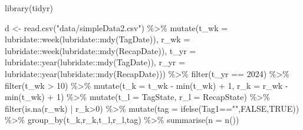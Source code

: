 \documentclass[
]{article}
\newenvironment{Shaded}{\begin{snugshade}}{\end{snugshade}}
\newcommand{\AttributeTok}[1]{\textcolor[rgb]{0.77,0.63,0.00}{#1}}
\newcommand{\ConstantTok}[1]{\textcolor[rgb]{0.00,0.00,0.00}{#1}}
\newcommand{\DecValTok}[1]{\textcolor[rgb]{0.00,0.00,0.81}{#1}}
\newcommand{\FunctionTok}[1]{\textcolor[rgb]{0.00,0.00,0.00}{#1}}
\newcommand{\NormalTok}[1]{#1}
\newcommand{\OtherTok}[1]{\textcolor[rgb]{0.56,0.35,0.01}{#1}}
\newcommand{\SpecialCharTok}[1]{\textcolor[rgb]{0.00,0.00,0.00}{#1}}
\newcommand{\StringTok}[1]{\textcolor[rgb]{0.31,0.60,0.02}{#1}}
\begin{document}
\begin{Shaded}
\begin{Highlighting}[]
\FunctionTok{library}\NormalTok{(tidyr)}

\NormalTok{d }\OtherTok{\textless{}{-}} \FunctionTok{read.csv}\NormalTok{(}\StringTok{"data/simpleData2.csv"}\NormalTok{) }\SpecialCharTok{\%\textgreater{}\%}
  \FunctionTok{mutate}\NormalTok{(}\AttributeTok{t\_wk =}\NormalTok{ lubridate}\SpecialCharTok{::}\FunctionTok{week}\NormalTok{(lubridate}\SpecialCharTok{::}\FunctionTok{mdy}\NormalTok{(TagDate)),}
         \AttributeTok{r\_wk =}\NormalTok{ lubridate}\SpecialCharTok{::}\FunctionTok{week}\NormalTok{(lubridate}\SpecialCharTok{::}\FunctionTok{mdy}\NormalTok{(RecapDate)),}
         \AttributeTok{t\_yr =}\NormalTok{ lubridate}\SpecialCharTok{::}\FunctionTok{year}\NormalTok{(lubridate}\SpecialCharTok{::}\FunctionTok{mdy}\NormalTok{(TagDate)),}
         \AttributeTok{r\_yr =}\NormalTok{ lubridate}\SpecialCharTok{::}\FunctionTok{year}\NormalTok{(lubridate}\SpecialCharTok{::}\FunctionTok{mdy}\NormalTok{(RecapDate))) }\SpecialCharTok{\%\textgreater{}\%}
  \FunctionTok{filter}\NormalTok{(t\_yr }\SpecialCharTok{==} \DecValTok{2024}\NormalTok{) }\SpecialCharTok{\%\textgreater{}\%} 
  \FunctionTok{filter}\NormalTok{(t\_wk }\SpecialCharTok{\textgreater{}} \DecValTok{10}\NormalTok{) }\SpecialCharTok{\%\textgreater{}\%}
  \FunctionTok{mutate}\NormalTok{(}\AttributeTok{t\_k =}\NormalTok{ t\_wk }\SpecialCharTok{{-}} \FunctionTok{min}\NormalTok{(t\_wk) }\SpecialCharTok{+} \DecValTok{1}\NormalTok{,}
         \AttributeTok{r\_k =}\NormalTok{ r\_wk }\SpecialCharTok{{-}} \FunctionTok{min}\NormalTok{(t\_wk) }\SpecialCharTok{+} \DecValTok{1}\NormalTok{) }\SpecialCharTok{\%\textgreater{}\%}
  \FunctionTok{mutate}\NormalTok{(}\AttributeTok{t\_l =}\NormalTok{ TagState,}
         \AttributeTok{r\_l =}\NormalTok{ RecapState) }\SpecialCharTok{\%\textgreater{}\%}
  \FunctionTok{filter}\NormalTok{(}\FunctionTok{is.na}\NormalTok{(r\_wk) }\SpecialCharTok{|}\NormalTok{ r\_k}\SpecialCharTok{\textgreater{}}\DecValTok{0}\NormalTok{) }\SpecialCharTok{\%\textgreater{}\%} 
  \FunctionTok{mutate}\NormalTok{(}\AttributeTok{tag =} \FunctionTok{ifelse}\NormalTok{(Tag1}\SpecialCharTok{==}\StringTok{""}\NormalTok{,}\ConstantTok{FALSE}\NormalTok{,}\ConstantTok{TRUE}\NormalTok{)) }\SpecialCharTok{\%\textgreater{}\%}
  \FunctionTok{group\_by}\NormalTok{(t\_k,r\_k,t\_l,r\_l,tag) }\SpecialCharTok{\%\textgreater{}\%}
  \FunctionTok{summarise}\NormalTok{(}\AttributeTok{n =} \FunctionTok{n}\NormalTok{())}
\end{Highlighting}
\end{Shaded}
\end{document}
